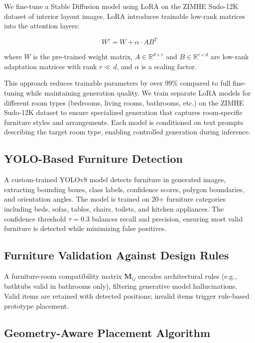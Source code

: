\documentclass[10pt,conference]{IEEEtran}
\begin{document}
We fine-tune a Stable Diffusion model using LoRA on the ZIMHE Sudo-12K dataset of interior layout images. LoRA introduces trainable low-rank matrices into the attention layers:

\begin{equation}
W' = W + \alpha \cdot AB^T
\end{equation}

where $W$ is the pre-trained weight matrix, $A \in \mathbb{R}^{d \times r}$ and $B \in \mathbb{R}^{r \times d}$ are low-rank adaptation matrices with rank $r \ll d$, and $\alpha$ is a scaling factor.

This approach reduces trainable parameters by over 99\% compared to full fine-tuning while maintaining generation quality. We train separate LoRA models for different room types (bedrooms, living rooms, bathrooms, etc.) on the ZIMHE Sudo-12K dataset to ensure specialized generation that captures room-specific furniture styles and arrangements. Each model is conditioned on text prompts describing the target room type, enabling controlled generation during inference.

\subsection{YOLO-Based Furniture Detection}

A custom-trained YOLOv8 model detects furniture in generated images, extracting bounding boxes, class labels, confidence scores, polygon boundaries, and orientation angles. The model is trained on 20+ furniture categories including beds, sofas, tables, chairs, toilets, and kitchen appliances. The confidence threshold $\tau = 0.3$ balances recall and precision, ensuring most valid furniture is detected while minimizing false positives.

\subsection{Furniture Validation Against Design Rules}

A furniture-room compatibility matrix $\mathbf{M}_{ij}$ encodes architectural rules (e.g., bathtubs valid in bathrooms only), filtering generative model hallucinations. Valid items are retained with detected positions; invalid items trigger rule-based prototype placement.

\subsection{Geometry-Aware Placement Algorithm}
\end{document}
